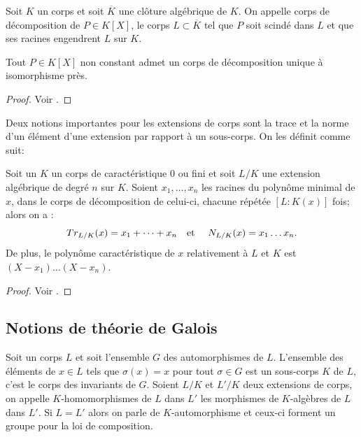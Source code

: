 \documentclass[a4paper]{article} %
\numberwithin{section}{part}
\numberwithin{equation}{section}
\newcommand\etmath{\textup{\quad et \quad}}
\begin{document}
\begin{defn}
\label{def:dec}
Soit $K$ un corps et soit $\overline{K}$ une clôture algébrique de $K$. On 
appelle corps de décomposition de $P\in K[X]$, le corps $L\subset\overline{K}$ 
tel que $P$ soit scindé dans $L$ et que ses racines engendrent $L$ sur $K$.
\end{defn}

\begin{thm}
\label{cor:dec}
Tout $P\in K[X]$ non constant admet un corps de décomposition unique à 
isomorphisme près.
\end{thm}
\begin{proof}
    Voir \cite[Chap III, th. 1.30]{Per}.
\end{proof}




Deux notions importantes pour les extensions de corps sont la trace et la norme
d'un élément d'une extension par rapport à un sous-corps. On les définit comme
suit:

\begin{defnp}
Soit un $K$ un corps de caractéristique 0 ou fini et soit $L/K$ une extension
algébrique de degré $n$ sur $K$. Soient $x_1,\dots, x_n$ les racines du polynôme
minimal de $x$, dans le corps de décomposition de celui-ci, chacune répétée 
$[L:K(x)]$ fois; alors on a :
\begin{equation}
Tr_{L/K}(x) = x_1 + \dots + x_n \etmath N_{L/K}(x) = x_1\dots x_n.
\end{equation}
De plus, le polynôme caractéristique de $x$ relativement à $L$ et $K$ est $(X -
x_1)\dots(X - x_n)$.
\end{defnp}
\begin{proof}
Voir \cite[p. 44, prop. 1]{Sam}.
\end{proof}
\subsection{Notions de théorie de Galois}
Soit un corps $L$ et soit l'ensemble $G$ des automorphismes de $L$. L'ensemble 
des éléments de $x\in L$ tels que $\sigma(x) = x$ pour tout $\sigma\in G$ est un
sous-corps $K$ de $L$, c'est le corps des invariants de $G$. Soient $L/K$ et
$L'/K$ deux extensions de corps, on appelle $K$-homomorphismes de $L$ dans $L'$ 
les morphismes de $K$-algèbres de $L$ dans $L'$. Si $L = L'$ alors on parle de
$K$-automorphisme et ceux-ci forment un groupe pour la loi de composition.
\end{document}
